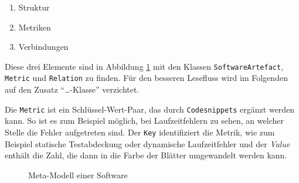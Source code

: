 \begin{enumerate}
  \item Struktur
  \item Metriken
  \item Verbindungen
\end{enumerate}

Diese drei Elemente sind in Abbildung \ref{fig:meta-model} mit den Klassen \texttt{SoftwareArtefact}, \texttt{Metric} und \texttt{Relation} zu finden. Für den besseren Lesefluss wird im Folgenden auf den Zusatz "`\dots-Klasse"' verzichtet.

Die \texttt{Metric} ist ein Schlüssel-Wert-Paar, das durch \texttt{Codesnippets} ergänzt werden kann. So ist es zum Beispiel möglich, bei Laufzeitfehlern zu sehen, an welcher Stelle die Fehler aufgetreten sind. Der \texttt{Key} identifiziert die Metrik, wie zum Beispiel statische Testabdeckung oder dynamische Laufzeitfehler und der \textit{Value} enthält die Zahl, die dann in die Farbe der Blätter umgewandelt werden kann.


\begin{figure}[htb]
\caption{Meta-Modell einer Software}
\label{fig:meta-model}
\end{figure}

